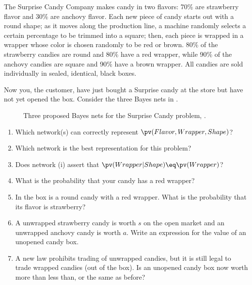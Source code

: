 \begin{uexercise}
The Surprise Candy Company makes
candy in two flavors: 70\% are strawberry flavor and 30\% are anchovy
flavor.  Each new piece of candy starts out with a round shape; as it
moves along the production line, a machine randomly selects a certain
percentage to be trimmed into a square; then, each piece is wrapped in
a wrapper whose color is chosen randomly to be red or brown.  80\% of the strawberry
candies are round and 80\% have a red wrapper, while 90\% of the
anchovy candies are square and 90\% have a brown wrapper. All candies are sold
individually in sealed, identical, black boxes.

Now you, the customer, have just bought a Surprise candy at the store
but have not yet opened the box. Consider the
three Bayes nets in .
%
\begin{figure}[htb]
{}
\caption{Three proposed Bayes nets for the Surprise Candy 
problem, . }
\label{3candy-figure}
\end{figure}
%
\begin{enumerate}
\item Which network(s) can correctly represent \(\pv(Flavor,Wrapper,Shape)\)?
\item Which network is the best representation for this problem?
\item Does network (i) assert that \(\pv(Wrapper|Shape)\eq \pv(Wrapper)\)?
\item What is the probability that your candy has a red wrapper?
\item In the box is a round candy with a red wrapper. What is the probability that its flavor is strawberry?
\item A unwrapped strawberry candy is worth \(s\) on the open market and an
         unwrapped anchovy candy is worth \(a\). Write an expression for the value of an unopened candy box.
\item A new law prohibits trading of unwrapped candies, but it is still legal to trade wrapped candies
         (out of the box). Is an unopened candy box now worth more than less than, or the same as before?
\end{enumerate}
\end{uexercise} 




